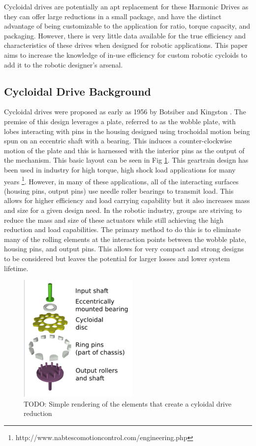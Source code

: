 \documentclass[letterpaper, 10 pt, conference]{ieeeconf}  %
\begin{document}
Cycloidal drives are potentially an apt replacement for these Harmonic Drives as they can offer large reductions in a small package, and have the distinct advantage of being customizable to the application for ratio, torque capacity, and packaging. However, there is very little data available for the true efficiency and characteristics of these drives when designed for robotic applications. This paper aims to increase the knowledge of in-use efficiency for custom robotic cycloids to add it to the robotic designer's arsenal.

\subsection{Cycloidal Drive Background}
Cycloidal drives were proposed as early as 1956 by Botsiber and Kingston \cite{1956}. The premise of this design leverages a plate, referred to as the wobble plate, with lobes interacting with pins in the housing designed using trochoidal motion being spun on an eccentric shaft with a bearing. This induces a counter-clockwise motion of the plate and this is harnessed with the interior pins as the output of the mechanism. This basic layout can be seen in Fig \ref{cycloid_cartoon}. This geartrain design has been used in industry for high torque, high shock load applications for many years \footnote{http://www.nabtescomotioncontrol.com/engineering.php}. However, in many of these applications, all of the interacting surfaces (housing pins, output pins) use needle roller bearings to transmit load. This allows for higher efficiency and load carrying capability but it also increases mass and size for a given design need. In the robotic industry, groups are striving to reduce the mass and size of these actuators while still achieving the high reduction and load capabilities. The primary method to do this is to eliminate many of the rolling elements at the interaction points between the wobble plate, housing pins, and output pins. This allows for very compact and strong designs to be considered but leaves the potential for larger losses and lower system lifetime. 

   \begin{figure}[!b]
      \centering
      \includegraphics[width=0.50\linewidth]{cycloid_cartoon_wiki}
      \caption{TODO: Simple rendering of the elements that create a cyloidal drive reduction}
      \label{cycloid_cartoon}
   \end{figure}
\end{document}
